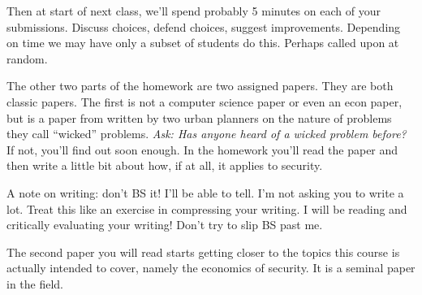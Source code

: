 \documentclass[11pt]{article}
\begin{document}
Then at start of next class, we'll spend probably 5 minutes on each of your submissions. Discuss choices, defend choices, suggest improvements. Depending on time we may have only a subset of students do this. Perhaps called upon at random. 

The other two parts of the homework are two assigned papers. They are both classic papers.
The first is not a computer science paper or even an econ paper, but is a paper from written by two urban planners on the nature of problems they call ``wicked'' problems. {\it Ask: Has anyone heard of a wicked problem before?} If not, you'll find out soon enough. In the homework you'll read the paper and then write a little bit about how, if at all, it applies to security. 

A note on writing: don't BS it! I'll be able to tell. I'm not asking you to write a lot. Treat this like an exercise in compressing your writing. I will be reading and critically evaluating your writing! Don't try to slip BS past me. 

The second paper you will read starts getting closer to the topics this course is actually intended to cover, namely the economics of security. It is a seminal paper in the field.
\end{document}
